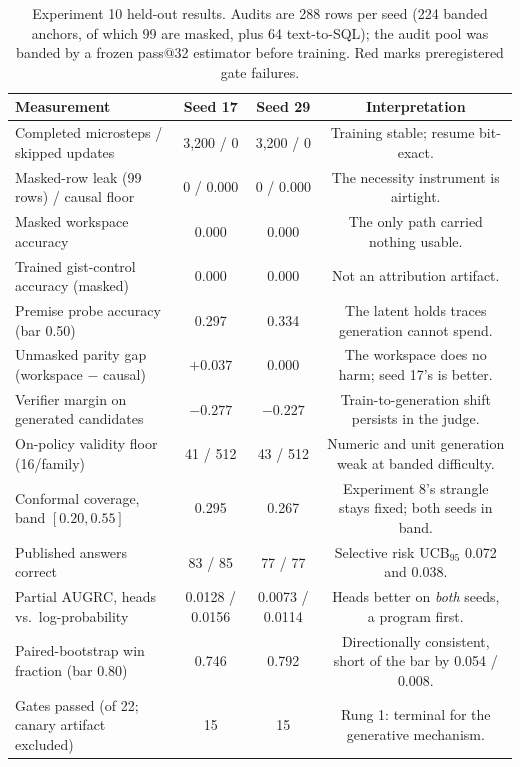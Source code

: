 \documentclass[10pt,a4paper]{article}
\newcommand{\fail}[1]{\textcolor{failred}{#1}}
\begin{document}
\begin{table}[htbp]
\caption{Experiment 10 held-out results. Audits are 288 rows per seed (224 banded
anchors, of which 99 are masked, plus 64 text-to-SQL); the audit pool was
banded by a frozen pass@32 estimator before training. Red marks preregistered
gate failures.}
\label{tab:study10}
\centering\footnotesize
\begin{tabularx}{\textwidth}{@{}Xccc@{}}
\toprule
\textbf{Measurement} & \textbf{Seed 17} & \textbf{Seed 29} & \textbf{Interpretation} \\
\midrule
Completed microsteps / skipped updates & 3{,}200 / 0 & 3{,}200 / 0 & Training stable; resume bit-exact. \\
Masked-row leak (99 rows) / causal floor & 0 / 0.000 & 0 / 0.000 & The necessity instrument is airtight. \\
Masked workspace accuracy & \fail{0.000} & \fail{0.000} & The only path carried nothing usable. \\
Trained gist-control accuracy (masked) & 0.000 & 0.000 & Not an attribution artifact. \\
Premise probe accuracy (bar 0.50) & \fail{0.297} & \fail{0.334} & The latent holds traces generation cannot spend. \\
Unmasked parity gap (workspace $-$ causal) & $+0.037$ & $0.000$ & The workspace does no harm; seed 17's is better. \\
Verifier margin on generated candidates & \fail{$-0.277$} & \fail{$-0.227$} & Train-to-generation shift persists in the judge. \\
On-policy validity floor (16/family) & \fail{41 / 512} & \fail{43 / 512} & Numeric and unit generation weak at banded difficulty. \\
Conformal coverage, band $[0.20, 0.55]$ & 0.295 & 0.267 & Experiment 8's strangle stays fixed; both seeds in band. \\
Published answers correct & 83 / 85 & 77 / 77 & Selective risk UCB$_{95}$ 0.072 and 0.038. \\
Partial AUGRC, heads vs.\ log-probability & 0.0128 / 0.0156 & 0.0073 / 0.0114 & Heads better on \emph{both} seeds, a program first. \\
Paired-bootstrap win fraction (bar 0.80) & \fail{0.746} & \fail{0.792} & Directionally consistent, short of the bar by 0.054 / 0.008. \\
Gates passed (of 22; canary artifact excluded) & 15 & 15 & Rung 1: terminal for the generative mechanism. \\
\bottomrule
\end{tabularx}
\end{table}
\end{document}
